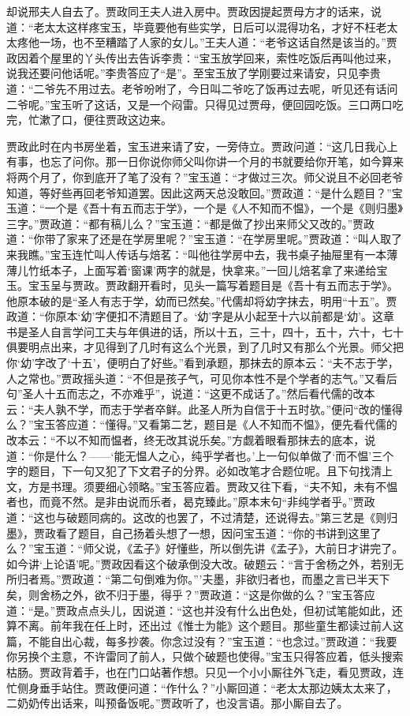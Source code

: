 \begin{parag}
    却说邢夫人自去了。贾政同王夫人进入房中。贾政因提起贾母方才的话来，说道：“老太太这样疼宝玉，毕竟要他有些实学，日后可以混得功名，才好不枉老太太疼他一场，也不至糟踏了人家的女儿。”王夫人道：“老爷这话自然是该当的。”贾政因着个屋里的丫头传出去告诉李贵：“宝玉放学回来，索性吃饭后再叫他过来，说我还要问他话呢。”李贵答应了“是”。至宝玉放了学刚要过来请安，只见李贵道：“二爷先不用过去。老爷吩咐了，今日叫二爷吃了饭再过去呢，听见还有话问二爷呢。”宝玉听了这话，又是一个闷雷。只得见过贾母，便回园吃饭。三口两口吃完，忙漱了口，便往贾政这边来。
\end{parag}


\begin{parag}
    贾政此时在内书房坐着，宝玉进来请了安，一旁侍立。贾政问道：“这几日我心上有事，也忘了问你。那一日你说你师父叫你讲一个月的书就要给你开笔，如今算来将两个月了，你到底开了笔了没有？”宝玉道：“才做过三次。师父说且不必回老爷知道，等好些再回老爷知道罢。因此这两天总没敢回。”贾政道：“是什么题目？”宝玉道：“一个是《吾十有五而志于学》，一个是《人不知而不愠》，一个是《则归墨》三字。”贾政道：“都有稿儿么？”宝玉道：“都是做了抄出来师父又改的。”贾政道：“你带了家来了还是在学房里呢？”宝玉道：“在学房里呢。”贾政道：“叫人取了来我瞧。”宝玉连忙叫人传话与焙茗：“叫他往学房中去，我书桌子抽屉里有一本薄薄儿竹纸本子，上面写着‘窗课’两字的就是，快拿来。”一回儿焙茗拿了来递给宝玉。宝玉呈与贾政。贾政翻开看时，见头一篇写着题目是《吾十有五而志于学》。他原本破的是“圣人有志于学，幼而已然矣。”代儒却将幼字抹去，明用“十五”。贾政道：“你原本‘幼’字便扣不清题目了。‘幼’字是从小起至十六以前都是‘幼’。这章书是圣人自言学问工夫与年俱进的话，所以十五，三十，四十，五十，六十，七十俱要明点出来，才见得到了几时有这么个光景，到了几时又有那么个光景。师父把你‘幼’字改了‘十五’，便明白了好些。”看到承题，那抹去的原本云：“夫不志于学，人之常也。”贾政摇头道：“不但是孩子气，可见你本性不是个学者的志气。”又看后句”圣人十五而志之，不亦难乎”，说道：“这更不成话了。”然后看代儒的改本云：“夫人孰不学，而志于学者卒鲜。此圣人所为自信于十五时欤。”便问“改的懂得么？”宝玉答应道：“懂得。”又看第二艺，题目是《人不知而不愠》，便先看代儒的改本云：“不以不知而愠者，终无改其说乐矣。”方觑着眼看那抹去的底本，说道：“你是什么？——‘能无愠人之心，纯乎学者也。’上一句似单做了‘而不愠’三个字的题目，下一句又犯了下文君子的分界。必如改笔才合题位呢。且下句找清上文，方是书理。须要细心领略。”宝玉答应着。贾政又往下看，“夫不知，未有不愠者也，而竟不然。是非由说而乐者，曷克臻此。”原本末句“非纯学者乎。”贾政道：“这也与破题同病的。这改的也罢了，不过清楚，还说得去。”第三艺是《则归墨》，贾政看了题目，自己扬着头想了一想，因问宝玉道：“你的书讲到这里了么？”宝玉道：“师父说，《孟子》好懂些，所以倒先讲《孟子》，大前日才讲完了。如今讲‘上论语’呢。”贾政因看这个破承倒没大改。破题云：“言于舍杨之外，若别无所归者焉。”贾政道：“第二句倒难为你。”’夫墨，非欲归者也，而墨之言已半天下矣，则舍杨之外，欲不归于墨，得乎？”贾政道：“这是你做的么？”宝玉答应道：“是。”贾政点点头儿，因说道：“这也并没有什么出色处，但初试笔能如此，还算不离。前年我在任上时，还出过《惟士为能》这个题目。那些童生都读过前人这篇，不能自出心裁，每多抄袭。你念过没有？”宝玉道：“也念过。”贾政道：“我要你另换个主意，不许雷同了前人，只做个破题也使得。”宝玉只得答应着，低头搜索枯肠。贾政背着手，也在门口站著作想。只见一个小小厮往外飞走，看见贾政，连忙侧身垂手站住。贾政便问道：“作什么？”小厮回道：“老太太那边姨太太来了，二奶奶传出话来，叫预备饭呢。”贾政听了，也没言语。那小厮自去了。

\end{parag}
